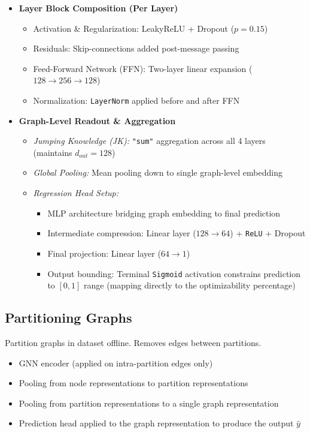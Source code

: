 \documentclass[paper=a4, fontsize=11pt]{scrartcl} %
\numberwithin{equation}{section} %
\numberwithin{figure}{section} %
\numberwithin{table}{section} %
\begin{document}
\begin{itemize}
    \item \textbf{Layer Block Composition (Per Layer)}
    \begin{itemize}
        \item Activation \& Regularization: LeakyReLU + Dropout ($p = 0.15$)
        \item Residuals: Skip-connections added post-message passing
        \item Feed-Forward Network (FFN): Two-layer linear expansion ($128 \rightarrow 256 \rightarrow 128$)
        \item Normalization: \texttt{LayerNorm} applied before and after FFN
    \end{itemize}

    \item \textbf{Graph-Level Readout \& Aggregation}
    \begin{itemize}
        \item \textit{Jumping Knowledge (JK):} \texttt{"sum"} aggregation across all 4 layers (maintains $d_{out} = 128$) 
        \item \textit{Global Pooling:} Mean pooling down to single graph-level embedding
        \item \textit{Regression Head Setup:}
        \begin{itemize}
            \item MLP architecture bridging graph embedding to final prediction
            \item Intermediate compression: Linear layer ($128 \rightarrow 64$) + \texttt{ReLU} + Dropout
            \item Final projection: Linear layer ($64 \rightarrow 1$)
            \item Output bounding: Terminal \texttt{Sigmoid} activation constrains prediction to $[0, 1]$ range (mapping directly to the optimizability percentage)
        \end{itemize}
    \end{itemize}
\end{itemize}


\subsection{Partitioning Graphs}
Partition graphs in dataset offline. Removes edges between partitions.

\begin{itemize}
  \item GNN encoder (applied on intra-partition edges only)
  \item Pooling from node representations to partition representations
  \item Pooling from partition representations to a single graph representation
  \item Prediction head applied to the graph representation to produce the output $\hat{y}$
\end{itemize}
\end{document}
